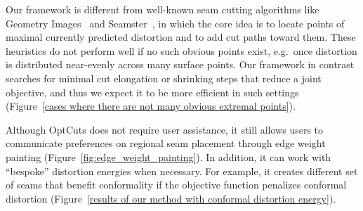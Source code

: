 Our framework is different from well-known seam cutting algorithms like Geometry Images~\cite{Gu2002Geometry} and Seamster~\cite{Sheffer2002Seamster}, in which the core idea is to locate points of maximal currently predicted distortion and to add cut paths toward them. These heuristics do not perform well if no such obvious points exist, e.g.\ once distortion is distributed near-evenly across many surface points. Our framework in contrast searches for minimal cut elongation or shrinking steps that reduce a joint objective, and thus we expect it to be more efficient in such settings (Figure~\ref{cases where there are not many obvious extremal points}).

Although OptCuts does not require user assistance, it still allows users to communicate preferences on regional seam placement through edge weight painting (Figure~\ref{fig:edge_weight_painting}).
In addition, it can work with ``bespoke'' distortion energies when necessary. %
For example, it creates different set of seams that benefit conformality if the objective function penalizes conformal distortion (Figure~\ref{results of our method with conformal distortion energy}).